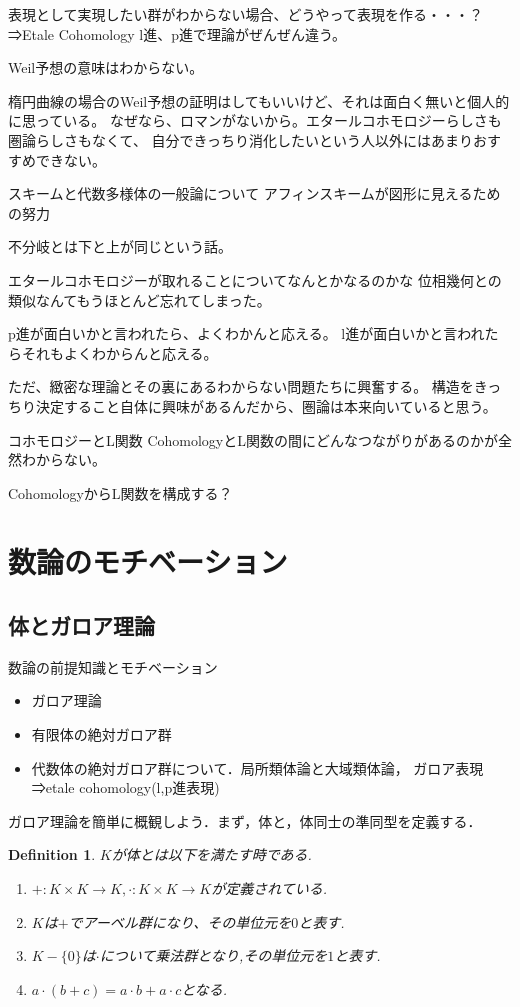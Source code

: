\documentclass{ujarticle}
\newtheorem{dfn}[thm]{Definition}
\begin{document}
表現として実現したい群がわからない場合、どうやって表現を作る・・・？
⇒Etale Cohomology
l進、p進で理論がぜんぜん違う。

Weil予想の意味はわからない。

楕円曲線の場合のWeil予想の証明はしてもいいけど、それは面白く無いと個人的に思っている。
なぜなら、ロマンがないから。エタールコホモロジーらしさも圏論らしさもなくて、
自分できっちり消化したいという人以外にはあまりおすすめできない。

スキームと代数多様体の一般論について
アフィンスキームが図形に見えるための努力

不分岐とは下と上が同じという話。

エタールコホモロジーが取れることについてなんとかなるのかな
位相幾何との類似なんてもうほとんど忘れてしまった。

p進が面白いかと言われたら、よくわかんと応える。
l進が面白いかと言われたらそれもよくわからんと応える。

ただ、緻密な理論とその裏にあるわからない問題たちに興奮する。
構造をきっちり決定すること自体に興味があるんだから、圏論は本来向いていると思う。

コホモロジーとL関数
CohomologyとL関数の間にどんなつながりがあるのかが全然わからない。

CohomologyからL関数を構成する？

\section{数論のモチベーション}
\label{sec:数論のモチベーション}

\subsection{体とガロア理論}
\label{subs:体とガロア理論}
数論の前提知識とモチベーション
\begin{itemize}
  \setlength{\parskip}{0cm} %
  \setlength{\itemsep}{0cm} %
  \item ガロア理論
  \item 有限体の絶対ガロア群
  \item 代数体の絶対ガロア群について．局所類体論と大域類体論，
  ガロア表現⇒etale cohomology(l,p進表現)
\end{itemize}

ガロア理論を簡単に概観しよう．まず，体と，体同士の準同型を定義する．

\begin{dfn}
$K$が体とは以下を満たす時である.
\begin{enumerate}
  \setlength{\parskip}{0cm} %
  \setlength{\itemsep}{0cm} %
  \item $ + :K \times K \to K, \cdot : K \times K \to K$が定義されている.
  \item $K$は$+$でアーベル群になり、その単位元を$0$と表す.
  \item $K - \{ 0 \}$は$  \cdot   $について乗法群となり,その単位元を$1$と表す.
  \item $a \cdot (b + c) = a \cdot b + a \cdot c $となる.
\end{enumerate}
\end{dfn}
\end{document}
